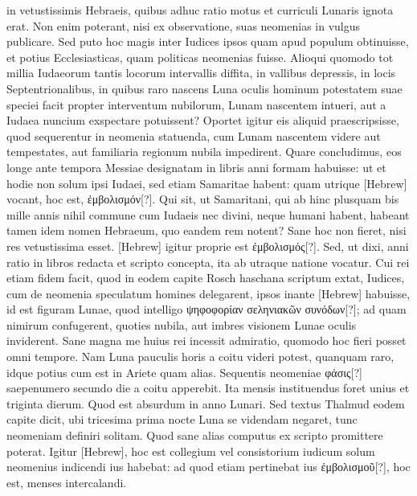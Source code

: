 in vetustissimis Hebraeis, quibus adhuc ratio motus et curriculi Lunaris
ignota erat.
Non enim poterant, nisi ex observatione, suas neomenias
in vulgus publicare.
Sed puto hoc magis inter Iudices ipsos
quam apud populum obtinuisse, et potius Ecclesiasticas, quam politicas
neomenias fuisse.
Alioqui quomodo tot millia Iudaeorum tantis
locorum intervallis diffita, in vallibus depressis, in locis Septentrionalibus,
in quibus raro nascens Luna oculis hominum potestatem
suae speciei facit propter interventum nubilorum, Lunam nascentem
intueri, aut a Iudaea nuncium exspectare potuissent?
Oportet igitur
eis aliquid praescripsisse, quod sequerentur in neomenia statuenda,
cum Lunam nascentem videre aut tempestates, aut familiaria regionum
nubila impedirent.
Quare concludimus, eos longe ante tempora
Messiae designatam in libris anni formam habuisse: ut et hodie non
solum ipsi Iudaei, sed etiam Samaritae habent:
 quam utrique \texthebrew{[Hebrew]} vocant,
hoc est, \textgreek{ἐμβολισμόν[?]}.
Qui sit, ut Samaritani, qui ab hinc plusquam
bis mille annis nihil commune cum Iudaeis nec divini, neque humani
habent, habeant tamen idem nomen Hebraeum, quo eandem rem
notent?
Sane hoc non fieret, nisi res vetustissima esset.
\texthebrew{[Hebrew]} igitur proprie
est \textgreek{ἐμβολισμός[?]}.
Sed, ut dixi, anni ratio in libros redacta et scripto
concepta, ita ab utraque natione vocatur.
Cui rei etiam fidem facit,
quod in eodem capite Rosch haschana scriptum extat, Iudices, cum
de neomenia speculatum homines delegarent,
 ipsos inante \texthebrew{[Hebrew]}
habuisse, id est figuram Lunae, quod intelligo
 \textgreek{ψηφοφορίαν σεληνιακῶν
συνόδων[?]};
ad quam nimirum confugerent, quoties nubila, aut imbres
visionem Lunae oculis inviderent.
Sane magna me huius rei incessit
admiratio, quomodo hoc fieri posset omni tempore.
Nam Luna
pauculis horis a coitu videri potest, quanquam raro, idque potius cum
est in Ariete quam alias.
Sequentis neomeniae \textgreek{φάσις[?]} saepenumero secundo
die a coitu apperebit.
Ita mensis instituendus foret unius et
triginta dierum.
Quod est absurdum in anno Lunari.
Sed textus Thalmud
eodem capite dicit, ubi tricesima prima nocte Luna se videndam
negaret, tunc neomeniam definiri solitam.
Quod sane alias computus
ex scripto promittere poterat.
Igitur \texthebrew{[Hebrew]}, hoc est collegium vel
consistorium iudicum solum neomenius indicendi ius habebat: ad
quod etiam pertinebat ius \textgreek{ἐμβολισμοῦ[?]},
 hoc est, menses intercalandi.

